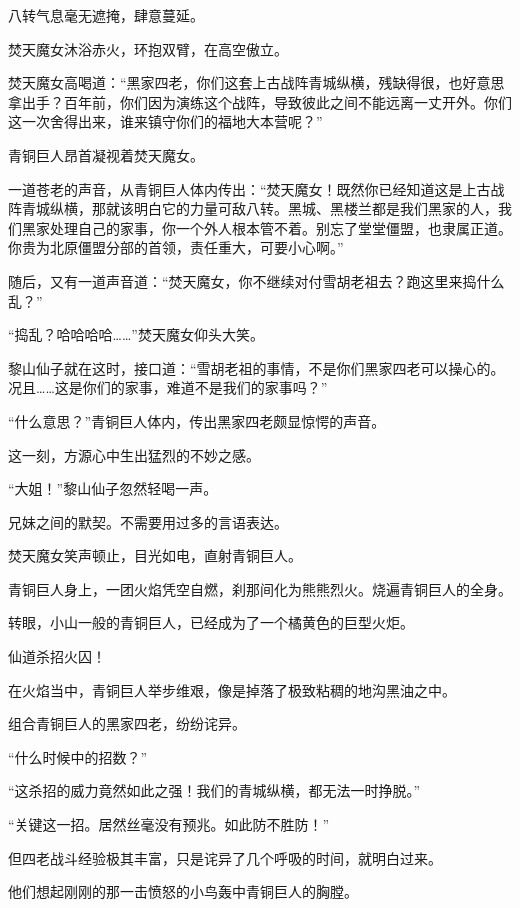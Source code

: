 
\begin{this_body}

八转气息毫无遮掩，肆意蔓延。

焚天魔女沐浴赤火，环抱双臂，在高空傲立。

焚天魔女高喝道：“黑家四老，你们这套上古战阵青城纵横，残缺得很，也好意思拿出手？百年前，你们因为演练这个战阵，导致彼此之间不能远离一丈开外。你们这一次舍得出来，谁来镇守你们的福地大本营呢？”

青铜巨人昂首凝视着焚天魔女。

一道苍老的声音，从青铜巨人体内传出：“焚天魔女！既然你已经知道这是上古战阵青城纵横，那就该明白它的力量可敌八转。黑城、黑楼兰都是我们黑家的人，我们黑家处理自己的家事，你一个外人根本管不着。别忘了堂堂僵盟，也隶属正道。你贵为北原僵盟分部的首领，责任重大，可要小心啊。”

随后，又有一道声音道：“焚天魔女，你不继续对付雪胡老祖去？跑这里来捣什么乱？”

“捣乱？哈哈哈哈……”焚天魔女仰头大笑。

黎山仙子就在这时，接口道：“雪胡老祖的事情，不是你们黑家四老可以操心的。况且……这是你们的家事，难道不是我们的家事吗？”

“什么意思？”青铜巨人体内，传出黑家四老颇显惊愕的声音。

这一刻，方源心中生出猛烈的不妙之感。

“大姐！”黎山仙子忽然轻喝一声。

兄妹之间的默契。不需要用过多的言语表达。

焚天魔女笑声顿止，目光如电，直射青铜巨人。

青铜巨人身上，一团火焰凭空自燃，刹那间化为熊熊烈火。烧遍青铜巨人的全身。

转眼，小山一般的青铜巨人，已经成为了一个橘黄色的巨型火炬。

仙道杀招火囚！

在火焰当中，青铜巨人举步维艰，像是掉落了极致粘稠的地沟黑油之中。

组合青铜巨人的黑家四老，纷纷诧异。

“什么时候中的招数？”

“这杀招的威力竟然如此之强！我们的青城纵横，都无法一时挣脱。”

“关键这一招。居然丝毫没有预兆。如此防不胜防！”

但四老战斗经验极其丰富，只是诧异了几个呼吸的时间，就明白过来。

他们想起刚刚的那一击愤怒的小鸟轰中青铜巨人的胸膛。


\end{this_body}
